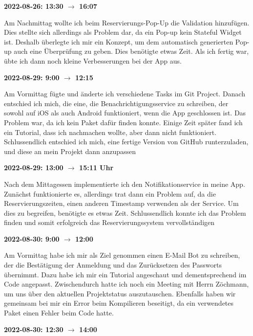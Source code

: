 \vspace{0.5cm} \textbf{2022-08-26: 13:30 $\rightarrow$ 16:07}

Am Nachmittag wollte ich beim Reservierungs-Pop-Up die Validation
hinzufügen. Dies stellte sich allerdings als Problem dar, da ein Pop-up
kein Stateful Widget ist. Deshalb überlegte ich mir ein Konzept, um
dem automatisch generierten Pop-up auch eine Überprüfung zu geben.
Dies benötigte etwas Zeit. Als ich fertig war, übte ich dann noch
kleine Verbesserungen bei der App aus.

\vspace{0.5cm} \textbf{2022-08-29: 9:00 $\rightarrow$ 12:15}

Am Vormittag fügte und änderte ich verschiedene Tasks im Git Project.
Danach entschied ich mich, die eine, die Benachrichtigungsservice zu schreiben,
der sowohl auf iOS als auch Android funktioniert, wenn die App
geschlossen ist. Das Problem war, da ich kein Paket dafür finden
konnte. Einige Zeit später fand ich ein Tutorial, dass ich nachmachen
wollte, aber dann nicht funktioniert. Schlussendlich entschied ich
mich, eine fertige Version von GitHub runterzuladen, und diese an mein
Projekt dann anzupassen

\vspace{0.5cm} \textbf{2022-08-29: 13:00 $\rightarrow$ 15:11 Uhr}

Nach dem Mittagessen implementierte ich den Notifikationservice in
meine App. Zunächst funktionierte es, allerdings trat dann ein Problem
auf, da die Reservierungszeiten, einen anderen Timestamp verwenden als
der Service. Um dies zu begreifen, benötigte es etwas Zeit.
Schlussendlich konnte ich das Problem finden und somit erfolgreich das
Reservierungssystem vervollständigen

\vspace{0.5cm} \textbf{2022-08-30: 9:00 $\rightarrow$ 12:00}

Am Vormittag habe ich mir als Ziel genommen einen E-Mail Bot zu schreiben,
der die Best\"atigung der Anmeldung und das Zurücksetzen des Passworts
übernimmt. Dazu habe ich mir ein Tutorial angeschaut und
dementsprechend im Code angepasst. Zwischendurch hatte ich noch ein
Meeting mit Herrn Zöchmann, um uns über den aktuellen Projektstatus
auszutauschen. Ebenfalls haben wir gemeinsam bei mir ein Error beim
Kompilieren beseitigt, da ein verwendetes Paket einen Fehler beim Code
hatte.

\vspace{0.5cm} \textbf{2022-08-30: 12:30 $\rightarrow$ 14:00}

